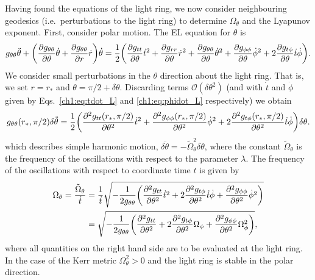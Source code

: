 Having found the equations of the light ring, we now consider neighbouring geodesics (i.e.\ perturbations to the light ring) to determine $\Omega_\theta$ and the Lyapunov exponent. 
First, consider polar motion. 
The EL equation for $\theta$ is 
\begin{equation}\label{ch1:eq:el_theta}
    g_{\theta \theta} \ddot{\theta} + \qty(\pdv{g_{\theta \theta}}{\theta} \dot{\theta} + \pdv{g_{\theta \theta}}{r} \dot{r}) \dot{\theta} = \frac{1}{2} \bigg(\pdv{g_{t t}}{\theta} \dot{t}^2 + \pdv{g_{r r}}{\theta} \dot{r}^2 + \pdv{g_{\theta \theta}}{\theta} \dot{\theta}^2 + \pdv{g_{\phi \phi}}{\theta} \dot{\phi}^2 + 2\pdv{g_{t \phi}}{\theta} \dot{t}\dot{\phi}\bigg).
\end{equation}
We consider small perturbations in the $\theta$ direction about the light ring.
That is, we set $r = r_*$ and $\theta = \pi/2+\delta\theta$.
Discarding terms $\mathcal{O}(\delta\theta^2)$ (and with $\dot{t}$ and $\dot{\phi}$ given by Eqs.~\ref{ch1:eq:tdot_L} and \ref{ch1:eq:phidot_L} respectively) we obtain
\begin{equation}\label{ch1:eq:el_theta_expanded}
    g_{\theta \theta}(r_*,\pi/2) \delta\ddot{\theta} = \frac{1}{2} \bigg(\pdv[2]{g_{t t}(r_*,\pi/2)}{\theta} \dot{t}^2 + \pdv[2]{g_{\phi\phi}(r_*,\pi/2)}{\theta} \dot{\phi}^2 + 2\pdv[2]{g_{t \phi}(r_*,\pi/2)}{\theta} \dot{t}\dot{\phi}\bigg)\delta\theta.
\end{equation}
which describes simple harmonic motion, $\delta\ddot{\theta} = -\tilde{\Omega}^2_\theta \delta\theta$, where the constant $\tilde{\Omega}_\theta$ is the frequency of the oscillations with respect to the parameter $\lambda$.
The frequency of the oscillations with respect to coordinate time $t$ is given by
\begin{align}
    \Omega_\theta = \frac{\tilde{\Omega}_\theta}{\dot{t}} &= \frac{1}{\dot{t}} \sqrt{-\frac{1}{2g_{\theta\theta}}\qty(\pdv[2]{g_{tt}}{\theta}\dot{t}^2 + 2\pdv[2]{g_{t\phi}}{\theta}\dot{t}\dot{\phi} + \pdv[2]{g_{\phi\phi}}{\theta}\dot{\phi}^2)} \nonumber \\
    &= \sqrt{-\frac{1}{2g_{\theta\theta}}\qty(\pdv[2]{g_{tt}}{\theta} + 2\pdv[2]{g_{t\phi}}{\theta}\Omega_\phi + \pdv[2]{g_{\phi\phi}}{\theta}\Omega_\phi^2)},
\end{align}
where all quantities on the right hand side are to be evaluated at the light ring. 
In the case of the Kerr metric $\Omega_\theta^2 > 0$ and the light ring is stable in the polar direction.

